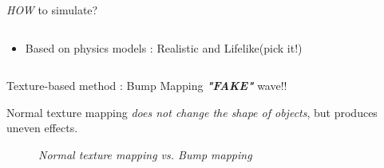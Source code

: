 \documentclass{beamer}
\begin{document}
\begin{frame}{\emph{HOW} to simulate?}
\begin{columns}[T]
\begin{column}
\begin{itemize}
        \item Based on physics models : Realistic and Lifelike(pick it!\checkmark)
        \begin{figure}[thpb]
          \centering
        \label{fig:system}
        \end{figure}
      \end{itemize}
    \end{column}%
  \end{columns}
\end{frame}
\begin{frame}{Texture-based method : Bump Mapping}
  \textcolor[rgb]{0.5,0.5,0.5}{\large \textcolor[rgb]{1,0,0}{\textbf{\emph{"FAKE"}}} wave!!}
  \par Normal texture mapping \textcolor[rgb]{0,0.6,0.8}{\emph{does not change the shape of objects}}, but produces uneven effects.

  \begin{figure}[thpb]
    \centering
    \caption*{\emph{Normal texture mapping \textcolor[rgb]{0,0,1}{vs.} Bump mapping}}
  \label{fig:system}
  \end{figure}
\end{frame}
\end{document}
